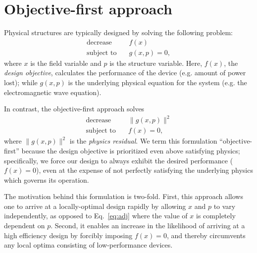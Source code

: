 \documentclass[letterpaper,10pt]{article}
\begin{document}
\section{Objective-first approach}
Physical structures are typically designed by solving the following problem:
    \begin{subequations}\label{eq:adj}
    \begin{align} 
    \text{decrease} & \quad f(x) \label{eq:adj:obj} \\ 
    \text{subject to} & \quad g(x,p) = 0, \label{eq:adj:con}
    \end{align}
    \end{subequations}
    where $x$ is the field variable and $p$ is the structure variable.
Here, $f(x)$, the \emph{design objective}, 
    calculates the performance of the device 
    (e.g. amount of power lost); 
    while $g(x,p)$ is the underlying physical equation for the system
    (e.g. the electromagnetic wave equation).

In contrast, the objective-first approach solves 
    \begin{subequations}\label{eq:ob1}
    \begin{align} 
    \text{decrease} & \quad \|g(x,p)\|^2 \label{eq:ob1:obj} \\ 
    \text{subject to} & \quad f(x) = 0, \label{eq:ob1:con}
    \end{align}
    \end{subequations}
    where $\|g(x,p)\|^2$ is the \emph{physics residual}.
We term this formulation ``objective-first''
    because the design objective is prioritized even above satisfying physics;
    specifically, we force our design to always exhibit the desired performance
    ($f(x) = 0$), even at the expense of
    not perfectly satisfying the underlying physics which governs its operation.

The motivation behind this formulation is two-fold.
First, this approach allows one to arrive at a locally-optimal design rapidly 
    by allowing $x$ and $p$ to vary independently, 
    as opposed to Eq.~\ref{eq:adj}
    where the value of $x$ is completely dependent on $p$.
Second, it enables an increase in the likelihood of 
    arriving at a high efficiency design
    by forcibly imposing $f(x) = 0$,
    and thereby circumvents any local optima consisting of
    low-performance devices.
\end{document}
